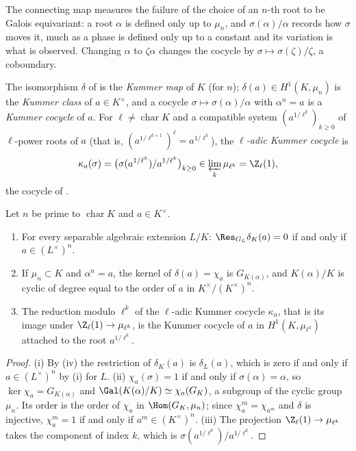 \begin{remark}
The connecting map measures the failure of the choice of an $n$-th root to be Galois equivariant: a root $\alpha$ is defined only up to $\mu_n$, and
$\sigma(\alpha)/\alpha$ records how $\sigma$ moves it, much as a phase is defined only up to a constant and its variation is what is observed. Changing $\alpha$ to
$\zeta\alpha$ changes the cocycle by $\sigma\mapsto\sigma(\zeta)/\zeta$, a coboundary.
\end{remark}

\begin{definition}\label{def:galcoh:kummer-class}
The isomorphism $\delta$ of  is the \emph{Kummer map} of $K$ (for $n$); $\delta(a)\in H^1(K,\mu_n)$ is the \emph{Kummer class} of
$a\in K^\times$, and a cocycle $\sigma\mapsto\sigma(\alpha)/\alpha$ with $\alpha^n=a$ is a \emph{Kummer cocycle} of $a$. For $\ell\ne\operatorname{char}K$ and a compatible
system $(a^{1/\ell^k})_{k\ge0}$ of $\ell$-power roots of $a$ (that is, $(a^{1/\ell^{k+1}})^\ell=a^{1/\ell^k}$), the \emph{$\ell$-adic Kummer cocycle} is
\[
\kappa_a(\sigma)=\bigl(\sigma(a^{1/\ell^k})/a^{1/\ell^k}\bigr)_{k\ge0}\in\varprojlim_k\mu_{\ell^k}=\Z_\ell(1),
\]
the cocycle of .
\end{definition}

\begin{proposition}\label{prop:galcoh:kummer-class}
Let $n$ be prime to $\operatorname{char}K$ and $a\in K^\times$.
\begin{enumerate}[label=(\roman*)]
\item For every separable algebraic extension $L/K$: $\Res_{G_L}\delta_K(a)=0$ if and only if $a\in(L^\times)^n$.
\item If $\mu_n\subset K$ and $\alpha^n=a$, the kernel of $\delta(a)=\chi_a$ is $G_{K(\alpha)}$, and $K(\alpha)/K$ is cyclic of degree equal to the order of $a$ in
$K^\times/(K^\times)^n$.
\item The reduction modulo $\ell^k$ of the $\ell$-adic Kummer cocycle $\kappa_a$, that is its image under $\Z_\ell(1)\to\mu_{\ell^k}$, is the Kummer cocycle of $a$ in
$H^1(K,\mu_{\ell^k})$ attached to the root $a^{1/\ell^k}$.
\end{enumerate}
\end{proposition}

\begin{proof}
(i) By (iv) the restriction of $\delta_K(a)$ is $\delta_L(a)$, which is zero if and only if $a\in(L^\times)^n$ by (i) for
$L$. (ii) $\chi_a(\sigma)=1$ if and only if $\sigma(\alpha)=\alpha$, so $\ker\chi_a=G_{K(\alpha)}$ and $\Gal(K(\alpha)/K)\simeq\chi_a(G_K)$, a subgroup of the cyclic group
$\mu_n$. Its order is the order of $\chi_a$ in $\Hom(G_K,\mu_n)$; since $\chi_a^m=\chi_{a^m}$ and $\delta$ is injective, $\chi_a^m=1$ if and only if $a^m\in(K^\times)^n$.
(iii) The projection $\Z_\ell(1)\to\mu_{\ell^k}$ takes the component of index $k$, which is $\sigma(a^{1/\ell^k})/a^{1/\ell^k}$.
\end{proof}


